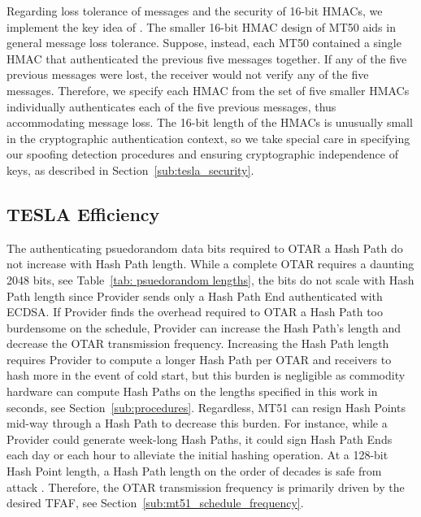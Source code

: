 \documentclass[APA,STIX1COL]{IONjournal/ION-APA Template}
\begin{document}
		Regarding loss tolerance of messages and the security of 16-bit HMACs, we implement the key idea of \cite{Neish_Dissertation}.
		The smaller 16-bit HMAC design of MT50 aids in general message loss tolerance.
		Suppose, instead, each MT50 contained a single HMAC that authenticated the previous five messages together.
		If any of the five previous messages were lost, the receiver would not verify any of the five messages.
		Therefore, we specify each HMAC from the set of five smaller HMACs individually authenticates each of the five previous messages, thus accommodating message loss.
		The 16-bit length of the HMACs is unusually small in the cryptographic authentication context, so we take special care in specifying our spoofing detection procedures and ensuring cryptographic independence of keys, as described in Section~\ref{sub:tesla_security}.

	\subsection{TESLA Efficiency} \label{sub:tesla_efficiency}

		The authenticating psuedorandom data bits required to OTAR a Hash Path do not increase with Hash Path length.
		While a complete OTAR requires a daunting 2048 bits, see Table~\ref{tab: psuedorandom lengths}, the bits do not scale with Hash Path length since Provider sends only a Hash Path End authenticated with ECDSA.
		If Provider finds the overhead required to OTAR a Hash Path too burdensome on the schedule, Provider can increase the Hash Path's length and decrease the OTAR transmission frequency.
		Increasing the Hash Path length requires Provider to compute a longer Hash Path per OTAR and receivers to hash more in the event of cold start, but this burden is negligible as commodity hardware can compute Hash Paths on the lengths specified in this work in seconds, see Section~\ref{sub:procedures}.
		Regardless, MT51 can resign Hash Points mid-way through a Hash Path to decrease this burden.
		For instance, while a Provider could generate week-long Hash Paths, it could sign Hash Path Ends each day or each hour to alleviate the initial hashing operation.
		At a 128-bit Hash Point length, a Hash Path length on the order of decades is safe from attack \cite{Neish_Dissertation}.
		Therefore, the OTAR transmission frequency is primarily driven by the desired TFAF, see Section~\ref{sub:mt51_schedule_frequency}.
\end{document}
